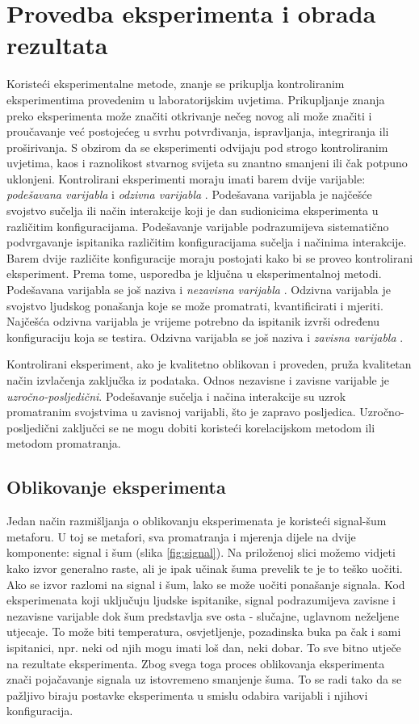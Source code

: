 \documentclass[times, utf8, zavrsni]{fer}
\begin{document}
\chapter{Provedba eksperimenta i obrada rezultata}
\label{ch:eksperiment}
Koristeći eksperimentalne metode, znanje se prikuplja kontroliranim eksperimentima provedenim u laboratorijskim uvjetima. Prikupljanje znanja preko eksperimenta može značiti otkrivanje nečeg novog ali može značiti i proučavanje već postojećeg u svrhu potvrđivanja, ispravljanja, integriranja ili proširivanja. S obzirom da se eksperimenti odvijaju pod strogo kontroliranim uvjetima, kaos i raznolikost stvarnog svijeta su znantno smanjeni ili čak potpuno uklonjeni. Kontrolirani eksperimenti moraju imati barem dvije varijable: \emph{podešavana varijabla}  i \emph{odzivna varijabla} . Podešavana varijabla je najčešće svojstvo sučelja ili način interakcije koji je dan sudionicima eksperimenta u različitim konfiguracijama. Podešavanje varijable podrazumijeva sistematično podvrgavanje ispitanika različitim konfiguracijama sučelja i načinima interakcije. Barem dvije različite konfiguracije moraju postojati kako bi se proveo kontrolirani eksperiment. Prema tome, usporedba je ključna u eksperimentalnoj metodi. Podešavana varijabla se još naziva i \emph{nezavisna varijabla} . Odzivna varijabla je svojstvo ljudskog ponašanja koje se može promatrati, kvantificirati i mjeriti. Najčešća odzivna varijabla je vrijeme potrebno da ispitanik izvrši određenu konfiguraciju koja se testira. Odzivna varijabla se još naziva i \emph{zavisna varijabla} .

Kontrolirani eksperiment, ako je kvalitetno oblikovan i proveden, pruža kvalitetan način izvlačenja zaključka iz podataka. Odnos nezavisne i zavisne varijable je \emph{uzročno-posljedični}. Podešavanje sučelja i načina interakcije su uzrok promatranim svojstvima u zavisnoj varijabli, što je zapravo posljedica. Uzročno-posljedični zaključci se ne mogu dobiti koristeći korelacijskom metodom ili metodom promatranja.

\section{Oblikovanje eksperimenta}
Jedan način razmišljanja o oblikovanju eksperimenata je koristeći signal-šum metaforu. U toj se metafori, sva promatranja i mjerenja dijele na dvije komponente: signal i šum (slika \ref{fig:signal}). Na priloženoj slici možemo vidjeti kako izvor generalno raste, ali je ipak učinak šuma prevelik te je to teško uočiti. Ako se izvor razlomi na signal i šum, lako se može uočiti ponašanje signala. Kod eksperimenata koji uključuju ljudske ispitanike, signal podrazumijeva zavisne i nezavisne varijable dok šum predstavlja sve osta - slučajne, uglavnom neželjene utjecaje. To može biti temperatura, osvjetljenje, pozadinska buka pa čak i sami ispitanici, npr. neki od njih mogu imati loš dan, neki dobar. To sve bitno utječe na rezultate eksperimenta. Zbog svega toga proces oblikovanja eksperimenta znači pojačavanje signala uz istovremeno smanjenje šuma. To se radi tako da se pažljivo biraju postavke eksperimenta u smislu odabira varijabli i njihovi konfiguracija.
\end{document}
